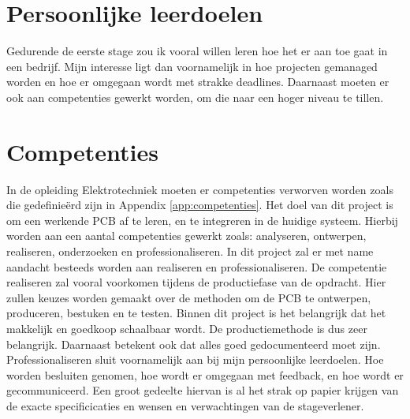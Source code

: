 \section{Persoonlijke leerdoelen}
Gedurende de eerste stage zou ik vooral willen leren hoe het er aan toe gaat in een bedrijf. Mijn interesse ligt dan voornamelijk in hoe projecten gemanaged worden en hoe er omgegaan wordt met strakke deadlines. Daarnaast moeten er ook aan competenties gewerkt worden, om die naar een hoger niveau te tillen.

\section{Competenties}
In de opleiding Elektrotechniek moeten er competenties verworven worden zoals die gedefinieërd zijn in Appendix \ref{app:competenties}. 
\newline
Het doel van dit project is om een werkende PCB af te leren, en te integreren in de huidige systeem. Hierbij worden aan een aantal competenties gewerkt zoals: analyseren, ontwerpen, realiseren, onderzoeken en professionaliseren. In dit project zal er met name aandacht besteeds worden aan realiseren en professionaliseren. 
\newline
De competentie realiseren zal vooral voorkomen tijdens de productiefase van de opdracht. Hier zullen keuzes worden gemaakt over de methoden om de PCB te ontwerpen, produceren, bestuken en te testen. Binnen dit project is het belangrijk dat het makkelijk en goedkoop schaalbaar wordt. De productiemethode is dus zeer belangrijk. Daarnaast betekent ook dat alles goed gedocumenteerd moet zijn. 
\newline
Professionaliseren sluit voornamelijk aan bij mijn persoonlijke leerdoelen. Hoe worden besluiten genomen, hoe wordt er omgegaan met feedback, en hoe wordt er gecommuniceerd. Een groot gedeelte hiervan is al het strak op papier krijgen van de exacte specificicaties en wensen en verwachtingen van de stageverlener. 